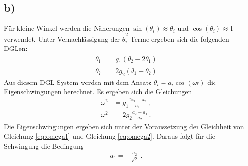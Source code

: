 \subsection*{b)}
Für kleine Winkel werden die Näherungen $\sin(\theta_i)\approx\theta_i$ und $\cos(\theta_i)\approx 1$ verwendet.
Unter Vernachlässigung der $\dot\theta_i^2$-Terme ergeben sich die folgenden DGLen:
\begin{align}
\ddot\theta_1&=g_1(\theta_2-2\theta_1)\\
\ddot\theta_2&=2g_2(\theta_1-\theta_2)
\end{align}
Aus diesem DGL-System werden mit dem Ansatz $\theta_i=a_i\cos(\omega t)$ die Eigenschwingungen berechnet.
Es ergeben sich die Gleichungen
\begin{align}
\omega^2&=g_1\frac{2a_1-a_2}{a_1}\label{eq:omega1}~,\\
\omega^2&=2g_2\frac{a_2-a_1}{a_2}\label{eq:omega2}~.
\end{align}
Die Eigenschwingungen ergeben sich unter der Voraussetzung der Gleichheit von Gleichung \eqref{eq:omega1} und Gleichung \eqref{eq:omega2}.
Daraus folgt für die Schwingung die Bedingung
\begin{align}
a_1=\pm\frac{a_2}{\sqrt{2}}~.
\end{align}